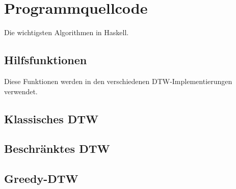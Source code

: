 \chapter{Programmquellcode}

Die wichtigsten Algorithmen in Haskell.

\section{Hilfsfunktionen}

Diese Funktionen werden in den verschiedenen DTW-Implementierungen verwendet.



\section{Klassisches DTW}



\section{Beschränktes DTW}



\section{Greedy-DTW}

